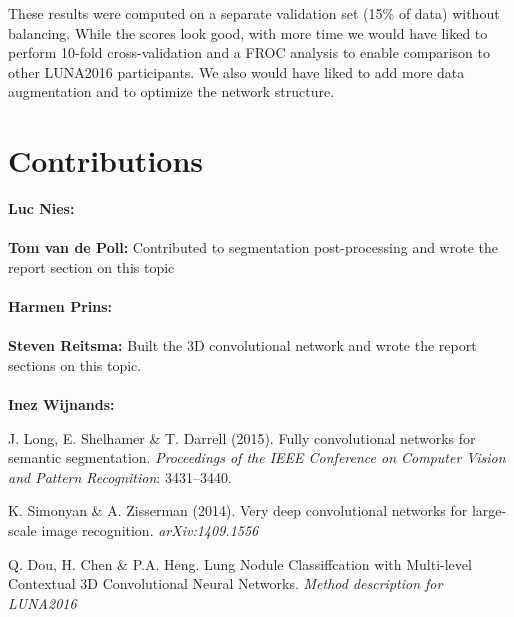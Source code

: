 \documentclass{article}
\begin{document}
These results were computed on a separate validation set (15\% of data) without balancing.
While the scores look good, with more time we would have liked to perform 10-fold cross-validation and a FROC analysis to enable comparison to other LUNA2016 participants.
We also would have liked to add more data augmentation and to optimize the network structure.

\appendix
\section{Contributions}
\textbf{Luc Nies:} \\
\\
\textbf{Tom van de Poll:} Contributed to segmentation post-processing and wrote the report section on this topic\\
\\
\textbf{Harmen Prins:} \\
\\
\textbf{Steven Reitsma:} Built the 3D convolutional network and wrote the report sections on this topic.\\
\\
\textbf{Inez Wijnands:} 



\begin{thebibliography}{}
J. Long, E. Shelhamer \& T. Darrell (2015). Fully convolutional networks for semantic segmentation. \emph{Proceedings of the IEEE Conference on Computer Vision and Pattern Recognition}: 3431--3440.

K. Simonyan \& A. Zisserman (2014). Very deep convolutional networks for large-scale image recognition. \emph{arXiv:1409.1556}

Q. Dou, H. Chen \& P.A. Heng. Lung Nodule Classiffcation with Multi-level Contextual 3D Convolutional Neural Networks. \emph{Method description for LUNA2016}


\end{thebibliography}
\end{document}
